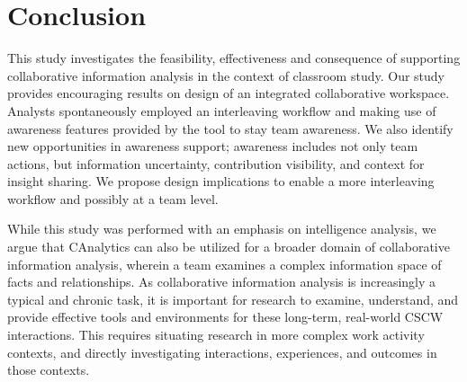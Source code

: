 \section{Conclusion}

This study investigates the feasibility, effectiveness and consequence of
supporting collaborative information analysis in the context of classroom study.
Our study provides encouraging results on design of an integrated collaborative
workspace. Analysts spontaneously employed an interleaving workflow and making
use of awareness features provided by the tool to stay team awareness. We also
identify new opportunities in awareness support; awareness includes not only
team actions, but information uncertainty, contribution visibility, and context
for insight sharing. We propose design implications to enable a more
interleaving workflow and possibly at a team level.

While this study was performed with an emphasis on intelligence analysis, we argue that CAnalytics can also be utilized for a broader domain of collaborative information analysis, wherein a team examines a complex information space of facts and relationships. As collaborative information analysis is increasingly a typical and chronic task, it is important for research to examine, understand, and provide effective tools and environments for these long-term, real-world CSCW interactions. This requires situating research in more complex work activity contexts, and directly investigating interactions, experiences, and outcomes in those contexts.





%
%
%
%
%
